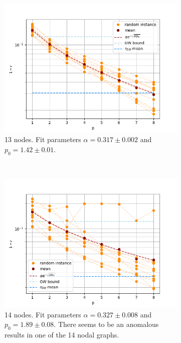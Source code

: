 \begin{figure}[H]
\begin{subfigure}[t]{0.45\textwidth}
		\centering
		\includegraphics[width=\textwidth]{figures/interp/fom_er075_n13}
		\caption{13 nodes. Fit parameters $\alpha = 0.317 \pm 0.002$ and $p_0 = 1.42 \pm 0.01$.}
	\end{subfigure}
	~
	\begin{subfigure}[t]{0.45\textwidth}
		\centering
		\includegraphics[width=\textwidth]{figures/interp/fom_er075_n14}
		\caption{14 nodes. Fit parameters $\alpha = 0.327 \pm 0.008$ and $p_0 = 1.89 \pm 0.08$. There seems to be an anomalous results in one of the 14 nodal graphs.}
	\end{subfigure}
	\\
	\begin{subfigure}[t]{0.45\textwidth}
		\centering

\end{subfigure}
\end{figure}
